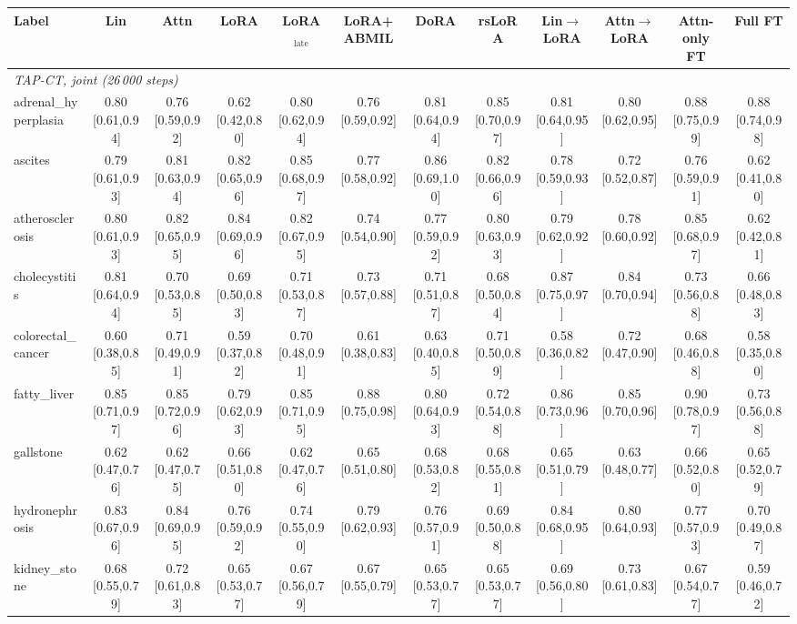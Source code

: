 \begin{tabular}{lccccccccccc}
\toprule
Label & Lin & Attn & LoRA & LoRA$_{\text{late}}$ & LoRA+ABMIL & DoRA & rsLoRA & Lin$\to$LoRA & Attn$\to$LoRA & Attn-only FT & Full FT \\
\midrule
\multicolumn{12}{l}{\textit{TAP-CT, joint (26\,000 steps)}} \\
adrenal\_hyperplasia & 0.80 [0.61,0.94] & 0.76 [0.59,0.92] & 0.62 [0.42,0.80] & 0.80 [0.62,0.94] & 0.76 [0.59,0.92] & 0.81 [0.64,0.94] & 0.85 [0.70,0.97] & 0.81 [0.64,0.95] & 0.80 [0.62,0.95] & 0.88 [0.75,0.99] & 0.88 [0.74,0.98] \\
ascites & 0.79 [0.61,0.93] & 0.81 [0.63,0.94] & 0.82 [0.65,0.96] & 0.85 [0.68,0.97] & 0.77 [0.58,0.92] & 0.86 [0.69,1.00] & 0.82 [0.66,0.96] & 0.78 [0.59,0.93] & 0.72 [0.52,0.87] & 0.76 [0.59,0.91] & 0.62 [0.41,0.80] \\
atherosclerosis & 0.80 [0.61,0.93] & 0.82 [0.65,0.95] & 0.84 [0.69,0.96] & 0.82 [0.67,0.95] & 0.74 [0.54,0.90] & 0.77 [0.59,0.92] & 0.80 [0.63,0.93] & 0.79 [0.62,0.92] & 0.78 [0.60,0.92] & 0.85 [0.68,0.97] & 0.62 [0.42,0.81] \\
cholecystitis & 0.81 [0.64,0.94] & 0.70 [0.53,0.85] & 0.69 [0.50,0.83] & 0.71 [0.53,0.87] & 0.73 [0.57,0.88] & 0.71 [0.51,0.87] & 0.68 [0.50,0.84] & 0.87 [0.75,0.97] & 0.84 [0.70,0.94] & 0.73 [0.56,0.88] & 0.66 [0.48,0.83] \\
colorectal\_cancer & 0.60 [0.38,0.85] & 0.71 [0.49,0.91] & 0.59 [0.37,0.82] & 0.70 [0.48,0.91] & 0.61 [0.38,0.83] & 0.63 [0.40,0.85] & 0.71 [0.50,0.89] & 0.58 [0.36,0.82] & 0.72 [0.47,0.90] & 0.68 [0.46,0.88] & 0.58 [0.35,0.80] \\
fatty\_liver & 0.85 [0.71,0.97] & 0.85 [0.72,0.96] & 0.79 [0.62,0.93] & 0.85 [0.71,0.95] & 0.88 [0.75,0.98] & 0.80 [0.64,0.93] & 0.72 [0.54,0.88] & 0.86 [0.73,0.96] & 0.85 [0.70,0.96] & 0.90 [0.78,0.97] & 0.73 [0.56,0.88] \\
gallstone & 0.62 [0.47,0.76] & 0.62 [0.47,0.75] & 0.66 [0.51,0.80] & 0.62 [0.47,0.76] & 0.65 [0.51,0.80] & 0.68 [0.53,0.82] & 0.68 [0.55,0.81] & 0.65 [0.51,0.79] & 0.63 [0.48,0.77] & 0.66 [0.52,0.80] & 0.65 [0.52,0.79] \\
hydronephrosis & 0.83 [0.67,0.96] & 0.84 [0.69,0.95] & 0.76 [0.59,0.92] & 0.74 [0.55,0.90] & 0.79 [0.62,0.93] & 0.76 [0.57,0.91] & 0.69 [0.50,0.88] & 0.84 [0.68,0.95] & 0.80 [0.64,0.93] & 0.77 [0.57,0.93] & 0.70 [0.49,0.87] \\
kidney\_stone & 0.68 [0.55,0.79] & 0.72 [0.61,0.83] & 0.65 [0.53,0.77] & 0.67 [0.56,0.79] & 0.67 [0.55,0.79] & 0.65 [0.53,0.77] & 0.65 [0.53,0.77] & 0.69 [0.56,0.80] & 0.73 [0.61,0.83] & 0.67 [0.54,0.77] & 0.59 [0.46,0.72] \\

\end{tabular}
